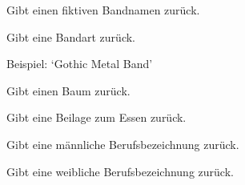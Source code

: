 \documentclass[a4paper,12pt,oneside]{sphinxmanual}
\begin{document}

\begin{fulllineitems}
\label{funktionen:pyzufall.band}
Gibt einen fiktiven Bandnamen zurück.

\end{fulllineitems}


\begin{fulllineitems}
\label{funktionen:pyzufall.bandart}
Gibt eine Bandart zurück.

Beispiel: `Gothic Metal Band'

\end{fulllineitems}


\begin{fulllineitems}
\label{funktionen:pyzufall.baum}
Gibt einen Baum zurück.

\end{fulllineitems}


\begin{fulllineitems}
\label{funktionen:pyzufall.beilage}
Gibt eine Beilage zum Essen zurück.

\end{fulllineitems}


\begin{fulllineitems}
\label{funktionen:pyzufall.beruf_m}
Gibt eine männliche Berufsbezeichnung zurück.

\end{fulllineitems}


\begin{fulllineitems}
\label{funktionen:pyzufall.beruf_w}
Gibt eine weibliche Berufsbezeichnung zurück.

\end{fulllineitems}
\end{document}
